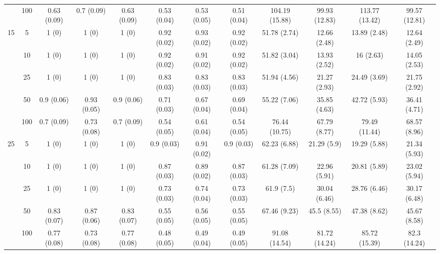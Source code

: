 \documentclass[10pt]{article}
\theoremstyle{definition}
\begin{document}
\begin{table}[H]
\begin{center}
{\begin{tabular}{cc|ccc|ccc|cccc|}
    & 100  & 0.63 (0.09) & 0.7 (0.09) & 0.63 (0.09) & 0.53 (0.04) & 0.53 (0.05) & 0.51 (0.04) & 104.19 (15.88) & 99.93 (12.83) & 113.77 (13.42) & 99.57 (12.81) \\[.3cm]  
   \multirow{5}{*}{15}  & 5  & 1 (0) & 1 (0) & 1 (0) & 0.92 (0.02) & 0.93 (0.02) & 0.92 (0.02) & 51.78 (2.74) & 12.66 (2.48) & 13.89 (2.48) & 12.64 (2.49) \\ 
    & 10  & 1 (0) & 1 (0) & 1 (0) & 0.92 (0.02) & 0.91 (0.02) & 0.92 (0.02) & 51.82 (3.04) & 13.93 (2.52) & 16 (2.63) & 14.05 (2.53) \\ 
    & 25  & 1 (0) & 1 (0) & 1 (0) & 0.83 (0.03) & 0.83 (0.03) & 0.83 (0.03) & 51.94 (4.56) & 21.27 (2.93) & 24.49 (3.69) & 21.75 (2.92) \\ 
    & 50  & 0.9 (0.06) & 0.93 (0.05) & 0.9 (0.06) & 0.71 (0.03) & 0.67 (0.04) & 0.69 (0.04) & 55.22 (7.06) & 35.85 (4.63) & 42.72 (5.93) & 36.41 (4.71) \\ 
    & 100  & 0.7 (0.09) & 0.73 (0.08) & 0.7 (0.09) & 0.54 (0.05) & 0.61 (0.04) & 0.54 (0.05) & 76.44 (10.75) & 67.79 (8.77) & 79.49 (11.44) & 68.57 (8.96) \\[.3cm]  
   \multirow{5}{*}{25}  & 5  & 1 (0) & 1 (0) & 1 (0) & 0.9 (0.03) & 0.91 (0.02) & 0.9 (0.03) & 62.23 (6.88) & 21.29 (5.9) & 19.29 (5.88) & 21.34 (5.93) \\ 
    & 10  & 1 (0) & 1 (0) & 1 (0) & 0.87 (0.03) & 0.89 (0.02) & 0.87 (0.03) & 61.28 (7.09) & 22.96 (5.91) & 20.81 (5.89) & 23.02 (5.94) \\ 
    & 25  & 1 (0) & 1 (0) & 1 (0) & 0.73 (0.03) & 0.74 (0.04) & 0.73 (0.03) & 61.9 (7.5) & 30.04 (6.46) & 28.76 (6.46) & 30.17 (6.48) \\ 
    & 50  & 0.83 (0.07) & 0.87 (0.06) & 0.83 (0.07) & 0.55 (0.05) & 0.56 (0.05) & 0.55 (0.05) & 67.46 (9.23) & 45.5 (8.55) & 47.38 (8.62) & 45.67 (8.58) \\ 
    & 100  & 0.77 (0.08) & 0.73 (0.08) & 0.77 (0.08) & 0.48 (0.05) & 0.49 (0.04) & 0.49 (0.05) & 91.08 (14.54) & 81.72 (14.24) & 85.72 (15.39) & 82.3 (14.24) \\ 
\end{tabular}}
   \end{center}
      \vspace{-.5cm}
\end{table}
\end{document}
